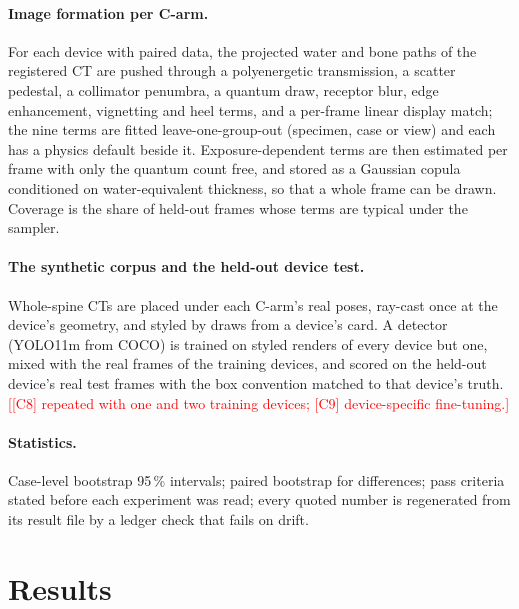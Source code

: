 \documentclass[11pt,letterpaper]{article}
\newcommand{\todo}[1]{\textcolor{red}{[#1]}}
\begin{document}
\paragraph{Image formation per C-arm.} For each device with paired data, the projected water and bone paths of the registered CT are pushed through a polyenergetic transmission, a scatter pedestal, a collimator penumbra, a quantum draw, receptor blur, edge enhancement, vignetting and heel terms, and a per-frame linear display match; the nine terms are fitted leave-one-group-out (specimen, case or view) and each has a physics default beside it. Exposure-dependent terms are then estimated per frame with only the quantum count free, and stored as a Gaussian copula conditioned on water-equivalent thickness, so that a whole frame can be drawn. Coverage is the share of held-out frames whose terms are typical under the sampler.
\paragraph{The synthetic corpus and the held-out device test.} Whole-spine CTs are placed under each C-arm's real poses, ray-cast once at the device's geometry, and styled by draws from a device's card. A detector (YOLO11m from COCO) is trained on styled renders of every device but one, mixed with the real frames of the training devices, and scored on the held-out device's real test frames with the box convention matched to that device's truth. \todo{[C8] repeated with one and two training devices; [C9] device-specific fine-tuning.}
\paragraph{Statistics.} Case-level bootstrap 95\,\% intervals; paired bootstrap for differences; pass criteria stated before each experiment was read; every quoted number is regenerated from its result file by a ledger check that fails on drift.

\section*{Results}
\end{document}
